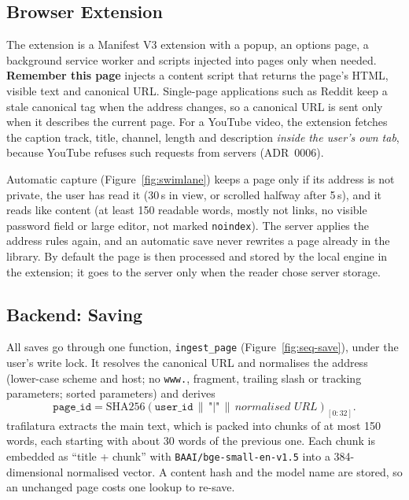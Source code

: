 \subsection{Browser Extension}

The extension is a Manifest V3 extension \cite{chromemv3} with a popup, an
options page, a background service worker and scripts injected into pages
only when needed. \textbf{Remember this page} injects a content script that
returns the page's HTML, visible text and canonical URL. Single-page
applications such as Reddit keep a stale canonical tag when the address
changes, so a canonical URL is sent only when it describes the current page.
For a YouTube video, the extension fetches the caption track, title, channel,
length and description \emph{inside the user's own tab}, because YouTube
refuses such requests from servers (ADR~0006).

Automatic capture (Figure~\ref{fig:swimlane}) keeps a page only if its address
is not private, the user has read it (30\,s in view, or scrolled halfway after
5\,s), and it reads like content (at least 150 readable words, mostly not
links, no visible password field or large editor, not marked
\texttt{noindex}). The server applies the address rules again, and an
automatic save never rewrites a page already in the library. By default the
page is then processed and stored by the local engine in the extension; it
goes to the server only when the reader chose server storage.

\subsection{Backend: Saving}

All saves go through one function, \texttt{ingest\_page}
(Figure~\ref{fig:seq-save}), under the user's write lock. It resolves the
canonical URL and normalises the address (lower-case scheme and host; no
\texttt{www.}, fragment, trailing slash or tracking parameters; sorted
parameters) and derives
\[
\texttt{page\_id} = \mathrm{SHA256}(\texttt{user\_id} \,\|\, \texttt{"|"} \,\|\, \textit{normalised URL})_{[0:32]}.
\]
trafilatura \cite{barbaresi2021trafilatura} extracts the main text, which is
packed into chunks of at most 150 words, each starting with about 30 words of
the previous one. Each chunk is embedded as ``title + chunk'' with
\texttt{BAAI/bge-small-en-v1.5} \cite{xiao2023bge,reimers2019sbert} into a
384-dimensional normalised vector. A content hash and the model name are
stored, so an unchanged page costs one lookup to re-save.

